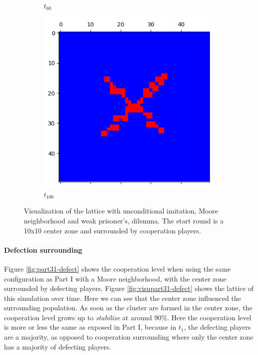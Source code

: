 \documentclass[letterpaper]{article}
\begin{document}
\begin{figure}[H]
\begin{subfigure}{.33\textwidth}
      \caption{$t_{60}$}
    \end{subfigure}
    \begin{subfigure}{.33\textwidth}
      \centering
      \includegraphics[width=1\linewidth]{images/assign2/part31-coop/t100}
      \caption{$t_{100}$}
    \end{subfigure}
    \caption{Visualization of the lattice with unconditional imitation,
    Moore neighborhood and weak prisoner's, dilemma. The start round is
    a 10x10 center zone and surrounded by cooperation players.}
    \label{fig:visupart31-coop}
\end{figure}

\paragraph{Defection surrounding}

Figure \ref{fig:part31-defect} shows
the cooperation level when using the same configuration as Part I
with a Moore neighborhood, with the center zone surrounded
by defecting players. Figure \ref{fig:visupart31-defect} shows the
lattice of this simulation over time. Here we can see that the center zone
influenced the surrounding population. As soon as the cluster are formed
in the center zone, the cooperation level grows up to \textit{stabilize}
at around 90\%. Here the cooperation level is more or less the same
as exposed in Part I, because in $t_1$, the defecting
players are a majority, as
opposed to cooperation surrounding where only the center zone has a majority
of defecting players.
\end{document}
